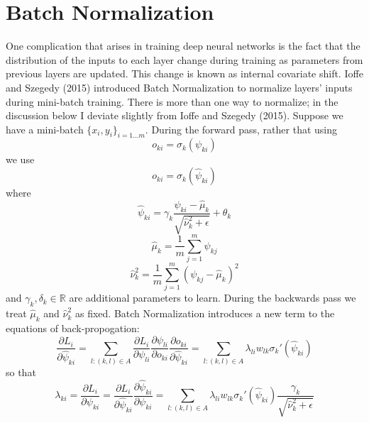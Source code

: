 \documentclass[11pt]{article}
\begin{document}
\section{Batch Normalization}
One complication that arises in training deep neural networks is the fact that the distribution of the inputs to each layer change during training as parameters from previous layers are updated. This change is known as internal covariate shift. Ioffe and Szegedy (2015) introduced Batch Normalization to normalize layers' inputs during mini-batch training. There is more than one way to normalize; in the discussion below I deviate slightly from Ioffe and Szegedy (2015).
Suppose we have a mini-batch $\{ x_i , y_i \}_{i=1...m}$. During the forward pass, rather that using
\begin{equation}
o_{ki} = \sigma_k \left( \psi_{ki} \right)
\end{equation}
we use
\begin{equation}
o_{ki} = \sigma_k \left( \widehat{\psi}_{ki} \right)
\end{equation}
where
\begin{equation}
\widehat{\psi}_{ki} = \gamma_k \frac{\psi_{ki} - \widehat{\mu}_k}{\sqrt{\widehat{\nu}_k^2 + \epsilon}} + \theta_k
\end{equation}
\begin{equation}
\widehat{\mu}_k = \frac{1}{m} \sum_{j=1}^m \psi_{kj}
\end{equation}
\begin{equation}
\widehat{\nu}_k^2 = \frac{1}{m} \sum_{j=1}^m \left( \psi_{kj} - \widehat{\mu}_k \right) ^2
\end{equation}
and $\gamma_k, \delta_k \in \mathbb{R}$ are additional parameters to learn. During the backwards pass we treat $\widehat{\mu}_k$ and $\widehat{\nu}_k^2$ as fixed. Batch Normalization introduces a new term to the equations of back-propogation:
\begin{equation}
\frac{\partial L_i}{\partial \widehat{\psi}_{ki}} = \sum_{l:\left(k,l\right) \in A} \frac{\partial L_i}{\partial \psi_{li}} \frac{\partial \psi_{li}}{\partial o_{ki}} \frac{\partial o_{ki}}{\partial \widehat{\psi}_{ki}} =
\sum_{l:\left(k,l\right) \in A} \lambda_{li} w_{lk} \sigma_k' \left( \widehat{\psi}_{ki} \right)
\end{equation}
so that
\begin{equation} \label{eq21}
\lambda _{ki} = \frac{\partial L_i}{\partial \psi _{ki}}
= \frac{\partial L_i}{\partial \widehat{\psi}_{ki}} \frac{\partial \widehat{\psi}_{ki}}{\partial \psi_{ki}}
= \sum_{l:\left( k,l \right) \in A} \lambda_{li} w_{lk} \sigma_k' \left( \widehat{\psi}_{ki} \right) \frac{\gamma_k}{\sqrt{\widehat{\nu}_k^2 + \epsilon}}
\end{equation}
\end{document}
